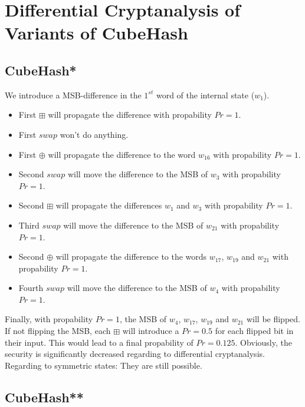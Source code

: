 

\renewcommand\thesubsection{\alph{subsection})}





\section{Differential Cryptanalysis of Variants of CubeHash}

\subsection{CubeHash*}

We introduce a MSB-difference in the $1^{st}$ word of the internal state ($w_1$).

\begin{itemize}
    \item First $\boxplus$ will propagate the difference with propability $Pr = 1$.
    \item First $swap$ won't do anything.
    \item First $\oplus$ will propagate the difference to the word $w_{16}$ with propability $Pr = 1$.
    \item Second $swap$ will move the difference to the MSB of $w_3$ with propability $Pr = 1$.
    \item Second $\boxplus$ will propagate the differences $w_1$ and $w_3$ with propability $Pr = 1$.
    \item Third $swap$ will move the difference to the MSB of $w_{21}$ with propability $Pr = 1$.
    \item Second $\oplus$ will propagate the difference to the words $w_{17}$, $w_{19}$ and $w_{21}$ with propability $Pr = 1$.
    \item Fourth $swap$ will move the difference to the MSB of $w_4$ with propability $Pr = 1$.
\end{itemize}

Finally, with propability $Pr = 1$, the MSB of $w_4$, $w_{17}$, $w_{19}$ and $w_{21}$ will be flipped. If not flipping the MSB, each $\boxplus$ will introduce a $Pr = 0.5$ for each flipped bit in their input. This would lead to a final propability of $Pr = 0.125$. Obviously, the security is significantly decreased regarding to differential cryptanalysis. Regarding to symmetric states: They are still possible.

\subsection{CubeHash**}

